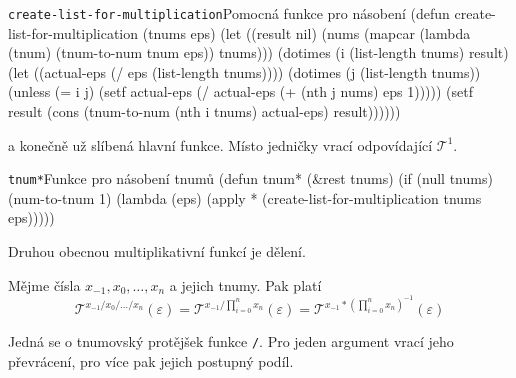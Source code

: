 \begin{lispcode}{\texttt{create-list-for-multiplication}}{Pomocná fun\-kce pro násobení}
(\textcolor{funkcionalni}{defun} \textcolor{pojmenovan}{create-list-for-multiplication} (tnums eps)
  (\textcolor{vedlejsi}{let} ((result nil)
      (nums
        (\textcolor{funkcionalni}{mapcar} (\textcolor{funkcionalni}{lambda} (tnum) (\textcolor{moje}{tnum-to-num} tnum eps)) tnums)))
    (\textcolor{funkcionalni}{dotimes} (i (\textcolor{funkcionalni}{list-length} tnums) result)
      (\textcolor{vedlejsi}{let} ((actual-eps (\textcolor{matematicke}{/} eps (\textcolor{funkcionalni}{list-length} tnums))))
        (\textcolor{funkcionalni}{dotimes} (j (\textcolor{funkcionalni}{list-length} tnums))
          (\textcolor{funkcionalni}{unless} (\textcolor{matematicke}{=} i j)
            (\textcolor{vedlejsi}{setf} actual-eps (\textcolor{matematicke}{/} actual-eps
              (\textcolor{matematicke}{+} (\textcolor{funkcionalni}{nth} j nums) eps 1)))))
        (\textcolor{vedlejsi}{setf} result (cons
          (\textcolor{moje}{tnum-to-num} (\textcolor{funkcionalni}{nth} i tnums) actual-eps) result))))))
\end{lispcode}

a konečně už slíbená hlavní funkce. Místo jedničky vrací odpovídající $\mathcal{T}^1$.

\begin{lispcode}{\texttt{tnum*}}{Funkce pro násobení tnumů}
(\textcolor{funkcionalni}{defun} \textcolor{pojmenovan}{tnum*} (&rest tnums)
  (\textcolor{funkcionalni}{if} (\textcolor{funkcionalni}{null} tnums)
    (\textcolor{moje}{num-to-tnum} 1)
    (\textcolor{funkcionalni}{lambda} (eps)
      (\textcolor{funkcionalni}{apply} \textquotesingle\textcolor{moje}{*} (\textcolor{moje}{create-list-for-multiplication} tnums eps)))))
\end{lispcode}

Druhou obecnou multiplikativní funkcí je dělení.

\begin{fact}
Mějme čísla $x_{-1}, x_0, \ldots, x_n$ a jejich tnumy. Pak platí
\begin{equation}
\mathcal{T}^{x_{-1}/x_0/\ldots /x_n}(\varepsilon)=\mathcal{T}^{x_{-1}/\prod_{i=0}^nx_n}(\varepsilon)=\mathcal{T}^{x_{-1}*(\prod_{i=0}^nx_n)^{-1}}(\varepsilon)
\end{equation}
\end{fact}

Jedná se o tnumovský protějšek funkce \texttt{/}. Pro jeden argument vrací jeho převrácení, pro více pak jejich postupný podíl.

